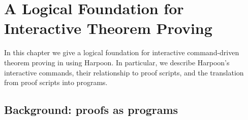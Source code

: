 \chapter{%
  A Logical Foundation for Interactive Theorem Proving%
}
\label{chap:theory}

In this chapter we give a logical foundation for interactive
command-driven theorem proving in \Beluga{} using Harpoon.
In particular, we describe Harpoon's interactive commands, their relationship
to proof scripts, and the translation from proof scripts into \Beluga{} programs.



\section{%
  Background:  proofs as programs%
}
\label{sec:beluga}

